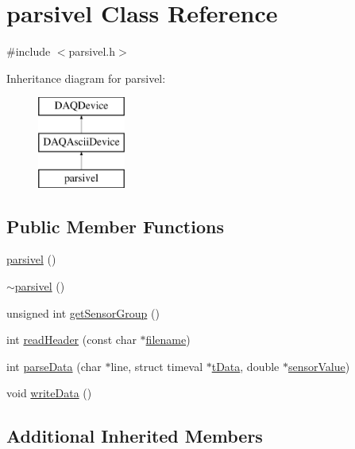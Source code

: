 \hypertarget{classparsivel}{\section{parsivel Class Reference}
\label{classparsivel}
}


{\ttfamily \#include $<$parsivel.\-h$>$}

Inheritance diagram for parsivel\-:\begin{figure}[H]
\begin{center}
\leavevmode
\includegraphics[height=3.000000cm]{classparsivel}
\end{center}
\end{figure}
\subsection*{Public Member Functions}
\begin{DoxyCompactItemize}
\item 
\hyperlink{classparsivel_a0744fdf7b0b79f498aa0ef3d9bcac0f2}{parsivel} ()
\item 
\hyperlink{classparsivel_a34d2688c5263aea7b7ac4c6e1f189c16}{$\sim$parsivel} ()
\item 
unsigned int \hyperlink{classparsivel_af756bf97da1b3023037090e9e7c1cfb8}{get\-Sensor\-Group} ()
\item 
int \hyperlink{classparsivel_ab2b3727aa63b91b2178d3ce5192ed830}{read\-Header} (const char $\ast$\hyperlink{classDAQDevice_a7f9cda7cf5b41f6b134c313477e9644b}{filename})
\item 
int \hyperlink{classparsivel_ab0195d09b023c63d725c551791c83462}{parse\-Data} (char $\ast$line, struct timeval $\ast$\hyperlink{classDAQDevice_af7da14a199a793fd63db3af2b2a78d92}{t\-Data}, double $\ast$\hyperlink{classDAQDevice_ad148188c57598fdf4fd4c1c333aeb0d8}{sensor\-Value})
\item 
void \hyperlink{classparsivel_a8e501c43f6ef4a197b92177729784286}{write\-Data} ()
\end{DoxyCompactItemize}
\subsection*{Additional Inherited Members}


